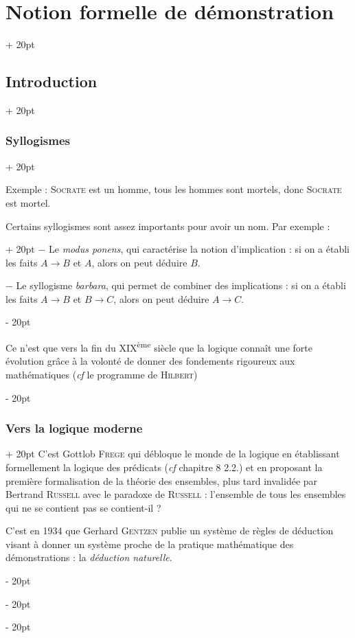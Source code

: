 \documentclass[a4paper, 12pt, twoside]{article}
\newcommand{\ind}[1][20pt]{\advance\leftskip + #1}
\newcommand{\deind}[1][20pt]{\advance\leftskip - #1}
\newenvironment{indt}[2][20pt]{#2 \par \ind[#1]}{\par \deind} %
\begin{document}
\begin{indt}{\section{Notion formelle de démonstration}}
\begin{indt}{\subsection{Introduction}}
\begin{indt}{\subsubsection{Syllogismes}}
                \vspace{12pt}
                
                Exemple : \textsc{Socrate} est un homme, tous les hommes sont mortels, donc \textsc{Socrate} est mortel.

                \vspace{12pt}
                
                \begin{indt}{Certains syllogismes sont assez importants pour avoir un nom. Par exemple :}
                    $-$ Le \emph{modus ponens}, qui caractérise la notion d'implication : si on a établi les faits $A \rightarrow B$ et $A$, alors on peut déduire $B$.

                    $-$ Le syllogisme \emph{barbara}, qui permet de combiner des implications : si on a établi les faits $A \rightarrow B$ et $B \rightarrow C$, alors on peut déduire $A \rightarrow C$.
                \end{indt}

                \vspace{6pt}
                
                Ce n'est que vers la fin du XIX\textsuperscript{ème} siècle que la logique connaît une forte évolution grâce à la volonté de donner des fondements rigoureux aux mathématiques (\textit{cf} le programme de \textsc{Hilbert})
            \end{indt}

            \vspace{12pt}
            
            \begin{indt}{\subsubsection{Vers la logique moderne}}
                C'est Gottlob \textsc{Frege} qui débloque le monde de la logique en établissant formellement la logique des prédicats (\textit{cf} chapitre 8 2.2.) et en proposant la première formalisation de la théorie des ensembles, plus tard invalidée par Bertrand \textsc{Russell} avec le paradoxe de \textsc{Russell} : l'ensemble de tous les ensembles qui ne se contient pas se contient-il ?

                C'est en 1934 que Gerhard \textsc{Gentzen} publie un système de règles de déduction visant à donner un système proche de la pratique mathématique des démonstrations : la \emph{déduction naturelle}.


\end{indt}
\end{indt}
\end{indt}
\end{document}
